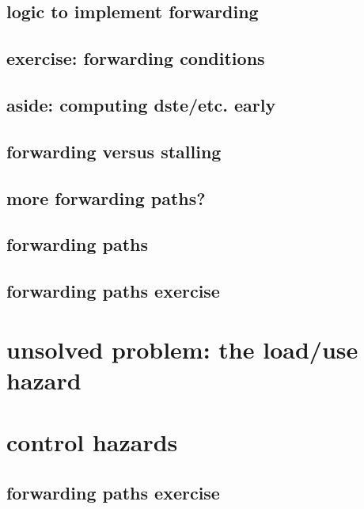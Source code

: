 \subsection{logic to implement forwarding}


\subsection{exercise: forwarding conditions}


\subsection{aside: computing dste/etc. early}


\subsection{forwarding versus stalling}


\subsection{more forwarding paths?}


\subsection{forwarding paths}

\subsection{forwarding paths exercise}


\section{unsolved problem: the load/use hazard}


\section{control hazards}


\subsection{forwarding paths exercise}



